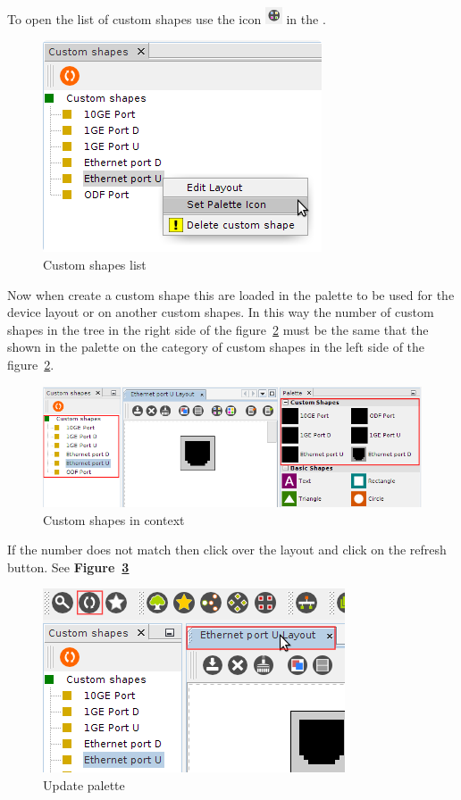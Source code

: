\documentclass[a4paper]{article}
\begin{document}
	To open the list of custom shapes use the icon \includegraphics[width=0.5cm]{img/device_layout_custom_shapes.png} in the \textbf{}.
	
	\begin{figure}[h!]
		\centering
		\includegraphics[width=0.4\linewidth]{img/custom_shapes_main.png}
		\caption{Custom shapes list}
		\label{fig:custom_shapes_main}
	\end{figure}
	
	Now when create a custom shape this are loaded in the palette to be used for the device layout or on another custom shapes. In this way the number of custom shapes in the tree in the right side of the figure~\ref{fig:custom_shape_ethernet_port} must be the same that the shown in the palette on the category of custom shapes in the left side of the figure~\ref{fig:custom_shape_ethernet_port}.
	
	\begin{figure}[h!]
		\centering
		\includegraphics[width=0.9\linewidth]{img/custom_shape_ethernet_port.png}
		\caption{Custom shapes in context}
		\label{fig:custom_shape_ethernet_port}
	\end{figure}
	
	If the number does not match then click over the layout and click on the refresh button. See \textbf{Figure~\ref{fig:custom_shape_update_palette}}
	
	\begin{figure}[h!]
		\centering
		\includegraphics[width=0.4\linewidth]{img/custom_shape_update_palette.png}
		\caption{Update palette}
		\label{fig:custom_shape_update_palette}
	\end{figure}
	\newpage
	
\end{document}
